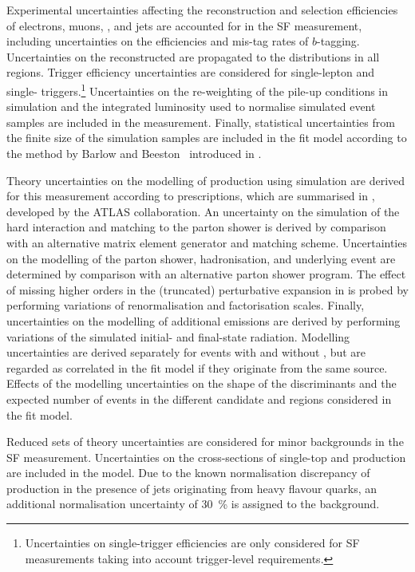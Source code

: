 Experimental uncertainties affecting the reconstruction and selection
efficiencies of electrons, muons, \tauhadvis, and jets are accounted for in the
SF measurement, including uncertainties on the efficiencies and mis-tag rates of
$b$-tagging. Uncertainties on the reconstructed \pTmissAbs are propagated to the
\mTW distributions in all regions. Trigger efficiency uncertainties are
considered for single-lepton and single-\tauhadvis
triggers.\footnote{Uncertainties on single-\tauhadvis trigger efficiencies are
  only considered for SF measurements taking into account trigger-level \tauid
  requirements.}  Uncertainties on the re-weighting of the pile-up conditions in
simulation and the integrated luminosity used to normalise simulated event
samples are included in the measurement. Finally, statistical uncertainties from
the finite size of the simulation samples are included in the fit model
according to the method by Barlow and Beeston~\cite{barlow1993,conway2011}
introduced in .

Theory uncertainties on the modelling of \ttbar production using simulation are
derived for this measurement according to prescriptions, which are summarised in
, developed by the ATLAS collaboration. An
uncertainty on the simulation of the hard interaction and matching to the parton
shower is derived by comparison with an alternative matrix element generator and
matching scheme. Uncertainties on the modelling of the parton shower,
hadronisation, and underlying event are determined by comparison with an
alternative parton shower program. The effect of missing higher orders in the
(truncated) perturbative expansion in \alphas is probed by performing variations
of renormalisation and factorisation scales. Finally, uncertainties on the
modelling of additional emissions are derived by performing variations of the
simulated initial- and final-state radiation. Modelling uncertainties are
derived separately for \ttbar events with and without \faketauhadvis, but are
regarded as correlated in the fit model if they originate from the same
source. Effects of the \ttbar modelling uncertainties on the shape of the \mTW
discriminants and the expected number of events in the different \tauhadvis
candidate \Ntracks and \pT regions considered in the fit model.

Reduced sets of theory uncertainties are considered for minor backgrounds in the
SF measurement. Uncertainties on the cross-sections of single-top and \Vjets
production are included in the model. Due to the known normalisation discrepancy
of \Vjets production in the presence of jets originating from heavy flavour
quarks, an additional normalisation uncertainty of \SI{30}{\percent} is assigned
to the \Vjets background.

